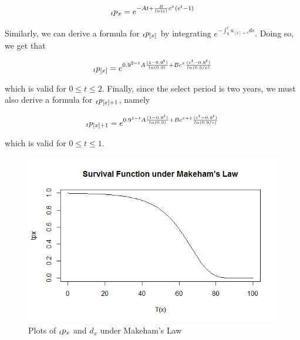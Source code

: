 \documentclass[12pt]{article}
\begin{document}
\begin{align*}
\hspace{0mm}_tp_x = e^{-At + \frac{B}{ln(c)}c^x(c^t -1)}
\end{align*}

Similarly, we can derive a formula for $\hspace{0mm}_tp_{[x]}$ by integrating $e^{-\int_{0}^{t}u_{[x]+s}ds}$. Doing so, we get that 

\begin{align*}
\hspace{0mm}_tp_{[x]} = 
e^{0.9^{2-t}A\frac{(1 - 0.9^t)}{ln(0.9)} + Bc^x\frac{(c^t - 0.9^t)}{ln(0.9/c)}}
\end{align*}

which is valid for $0\le t \le 2$. Finally, since the select period is two years, we must also derive a formula for $\hspace{0mm}_tp_{[x]+1}$, namely

\begin{align*}
\hspace{0mm}_tp_{[x]+1} = 
e^{0.9^{1-t}A\frac{(1-0.9^t)}{ln(0.9)} + Bc^{x+1}\frac{(c^t - 0.9^t)}{ln(0.9/c)}}
\end{align*}

which is valid for $0\le t \le 1$.

\begin{figure}[!ht]
\centering
\includegraphics[scale=0.4]{images/makehamsplot}
\caption{Plots of $\hspace{0mm}_tp_x$ and $d_x$ under Makeham's Law}
\end{figure}
\end{document}
